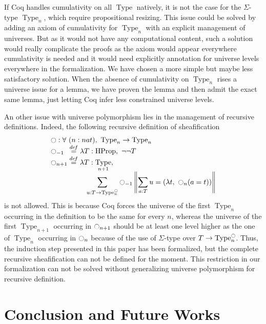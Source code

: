 \documentclass[conference]{IEEEtran}
\newcommand \defeq {\overset{de\hspace{-0.2ex}f}{=}}
\newcommand{\mynote}[2]{
    \fbox{\bfseries\sffamily\scriptsize#1}
    {\small$\blacktriangleright$\textsf{\emph{#2}}$\blacktriangleleft$}~}
\newcommand\nt[1]{\mynote{NT}{#1}}
\DeclareMathOperator{\Type}{Type}
\DeclareMathOperator{\HProp}{HProp}
\newcommand{\modal}{\ensuremath{\ocircle}}
\begin{document}
%
If Coq handles cumulativity on all $\Type$ natively, it is not
the case for the $\Sigma$-type $\Type_n$, which require propositional
resizing. 
%
This issue could be solved by adding an axiom of cumulativity
for $\Type_n$ with an explicit management of universes. 
%
But as it would not have any computational content, such a solution
would really complicate the proofs as the axiom would appear
everywhere cumulativity is needed and it would need explicitly
annotation for universe levels everywhere in the formalization.
%
We have chosen a more simple but maybe less satisfactory solution. 
%
When the absence of cumulativity on $\Type_n$ rises a universe issue
for a lemma, we have proven the lemma and then admit the exact same
lemma, just letting Coq infer less constrained universe levels.

An other issue with universe polymorphism lies in the management of
recursive definitions. Indeed, the following recursive definition of
sheafification
%
\[ \begin{array}{l}
   \modal : \forall \ (n : nat), \ \Type_n \to \Type_n 
   \\
    \modal_{-1\phantom{n}} \defeq \lambda T:\HProp,~ \lnot\lnot T \\
      \displaystyle{\modal_{n+1} \defeq  \lambda T:\Type_{n+1}},\\
      \hspace{5em} \displaystyle{\sum_{u:T \to \Type_n^\modal} \modal_{-1} 
      \left\|
      \sum_{a:T} u= (\lambda t,~\modal_n (a=t))
      \right\|}
    \end{array}
\]
%
is not allowed. 
%
This is because Coq forces the universe of the first $\Type_n$
occurring in the definition to be the same for every $n$, whereas the
universe of the first $\Type_{n+1}$ occurring in $\modal_{n+1}$ should be at
least one level higher as the one of $\Type_n$ occurring in
$\modal_{n}$ because of the use of $\Sigma$-type over
$T \to \Type_n^\modal$.
%
%
Thus, the induction step presented in this paper has been formalized,
but the complete recursive sheafification can not be defined for the
moment.
%
This restriction in our formalization can not be solved without
generalizing universe polymorphism for recursive definition.
%


\section{Conclusion and Future Works}
\label{sec:future-works}
\end{document}

